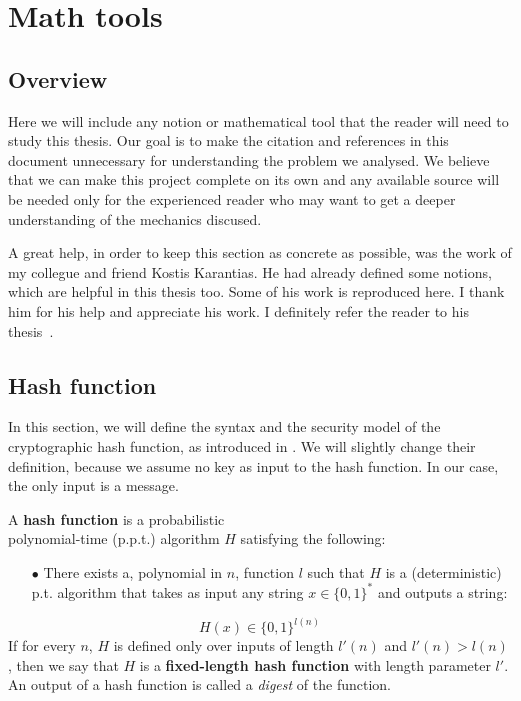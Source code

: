 \chapter{Math tools} \label{ch:math}
%
\section{Overview}
Here we will include any notion or mathematical tool that the reader will need to study this thesis. Our goal is to make the citation and references in this document unnecessary for understanding the problem we analysed. We believe that we can make this project complete on its own and any available source will be needed only for the experienced reader who may want to get a deeper understanding of the mechanics discused.

A great help, in order to keep this section as concrete as possible, was the work of my collegue and friend Kostis Karantias. He had already defined some notions, which are helpful in this thesis too. Some of his work is reproduced here. I thank him for his help and appreciate his work. I definitely refer the reader to his thesis~\cite{gtklocker}.
%
\section{Hash function}
%
In this section, we will define the syntax and the security model of the cryptographic hash function, as introduced in \cite{Katz:2007:IMC:1206501}. We will slightly change their definition, because we assume no key as input to the hash function. In our case, the only input is a message.
%
\begin{definition}
A \textbf{hash function} is a probabilistic \\
polynomial-time (p.p.t.) algorithm $H$ satisfying the following:
\begin{itemize}
  \item[$\bullet$] There exists a, polynomial in $n$, function $l$ such that $H$ is a (deterministic) p.t. algorithm that takes as input any string $x \in { \{ 0,1 \}}^*$ and outputs a string:
\end{itemize}
\begin{equation} \nonumber
  H(x) \in { \{ 0,1 \}}^{l(n)}
\end{equation}
If for every $n$, $H$ is defined only over inputs of length $l'(n)$ and $l'(n) > l(n)$, then
we say that $H$ is a \textbf{fixed-length hash function} with length parameter $l'$. An output of a hash function is called a \emph{digest} of the function.
\end{definition}

